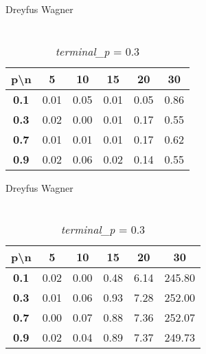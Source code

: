 \documentclass[a4paper,12pt]{article}
\begin{document}
    \begin{table}[h!]
        \begin{minipage}{0.47\textwidth}
            \centering
            \caption*{Average Time Complexity (ms)}
            {\vspace{-0.5em}Dreyfus Wagner\par\vspace{1em}}
            \begin{tabular}{c|ccccc}
                \toprule
                \textbf{p\textbackslash n} & \textbf{5} & \textbf{10} & \textbf{15} & \textbf{20} & \textbf{30} \\
                \midrule
                \textbf{0.1} & 0.01 & 0.05 & 0.01 & 0.05 & 0.86 \\
                \textbf{0.3} & 0.02 & 0.00 & 0.01 & 0.17 & 0.55 \\
                \textbf{0.7} & 0.01 & 0.01 & 0.01 & 0.17 & 0.62 \\
                \textbf{0.9} & 0.02 & 0.06 & 0.02 & 0.14 & 0.55 \\
                \bottomrule
            \end{tabular}
            \caption*{\\\textit{terminal\_p} = $0.1$}
        \end{minipage}
        \hfill
        \begin{minipage}{0.47\textwidth}
            \centering
            \caption*{Average Time Complexity (ms)}
            {\vspace{-0.5em}Dreyfus Wagner\par\vspace{1em}}
            \begin{tabular}{c|ccccc}
                \toprule
                \textbf{p\textbackslash n} & \textbf{5} & \textbf{10} & \textbf{15} & \textbf{20} & \textbf{30} \\
                \midrule
                \textbf{0.1} & 0.02 & 0.00 & 0.48 & 6.14 & 245.80 \\
                \textbf{0.3} & 0.01 & 0.06 & 0.93 & 7.28 & 252.00 \\
                \textbf{0.7} & 0.00 & 0.07 & 0.88 & 7.36 & 252.07 \\
                \textbf{0.9} & 0.02 & 0.04 & 0.89 & 7.37 & 249.73 \\
                \bottomrule
            \end{tabular}
            \caption*{\\\textit{terminal\_p} = $0.3$}
        \end{minipage}
    \end{table}
\end{document}
